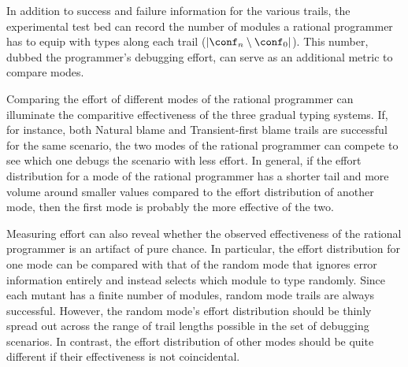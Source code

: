 
In addition to success and failure information for the various trails, the
experimental test bed can record the number of modules a rational programmer has
to equip with types along each trail ($\lvert \conf_n \setminus \conf_0
\rvert$). This number, dubbed the programmer's debugging effort, can serve as an additional metric to compare modes.

Comparing the effort of different modes of the rational programmer can
illuminate the comparitive effectiveness of the three gradual typing
systems. If, for instance, both
Natural blame and Transient-first blame trails are successful for the same scenario, the two modes of
the rational programmer can compete to see which one debugs the
scenario with less effort. In general, if the effort distribution for a mode of
the rational programmer has a shorter tail and more volume around smaller values
compared to the effort distribution of another mode, then the first mode is
probably the more effective of the two.

Measuring effort can also reveal whether the observed effectiveness of the
rational programmer is an artifact of pure chance.
In particular, the effort distribution for one mode can be compared with that of
the random mode that ignores error information entirely and instead selects which
module to type randomly.  Since each mutant has a finite number of
modules, random mode trails are always successful. However, the random mode's effort
distribution should be thinly spread out across the range of trail lengths possible
in the set of debugging scenarios.
In contrast, the effort distribution of other modes should be quite different if their effectiveness is not coincidental.
